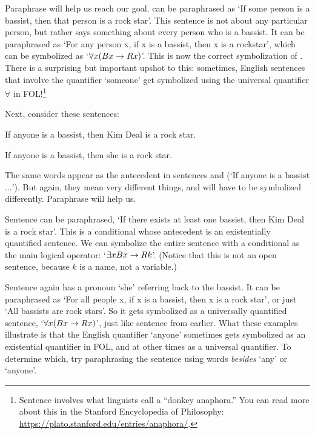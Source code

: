 Paraphrase will help us reach our goal.   can be paraphrased as `If some person is a bassist, then that person is a rock star'. This sentence is not about any particular person, but rather says something about every person who is a bassist.  It can be paraphrased as `For any person x, if x is a bassist, then x is a rockstar', which can be symbolized as `$\forall x (Bx \rightarrow Rx)$'.  This is now the correct symbolization of .  There is a surprising but important upshot to this: sometimes, English sentences that involve the quantifier `someone' get symbolized using the universal quantifier $\forall$ in FOL!\footnote{Sentence  involves what linguists call a ``donkey anaphora.''  You can read more about this in the Stanford Encyclopedia of Philosophy: \href{https://plato.stanford.edu/entries/anaphora/}{https://plato.stanford.edu/entries/anaphora/}.}




Next, consider these sentences:
	\begin{earg}
		\item[\ex{anyone1}] If anyone is a bassist, then Kim Deal is a rock star.
		\item[\ex{anyone2}] If anyone is a bassist, then she is a rock star.
	\end{earg}
The same words appear as the antecedent in sentences  and   (`If anyone is a bassist$\ldots$'). But again, they mean very different things, and will have to be symbolized differently.  Paraphrase will help us.

Sentence  can be paraphrased, `If there exists at least one bassist, then Kim Deal is a rock star'. This is a conditional whose antecedent is an existentially quantified sentence.  We can symbolize the entire sentence with a conditional as the main logical operator: `$\exists x Bx \rightarrow Rk$'.  (Notice that this is not an open sentence, because $k$ is a name, not a variable.)

Sentence  again has a pronoun `she' referring back to the bassist.  It can be paraphrased as `For all people x, if x is a bassist, then x is a rock star', or just `All bassists are rock stars'. So it gets symbolized as a universally quantified sentence, `$\forall x(Bx \rightarrow Rx)$', just like sentence  from earlier.  What these examples illustrate is that the English quantifier `anyone' sometimes gets symbolized as an existential quantifier in FOL, and at other times as a universal quantifier.   To determine which, try paraphrasing the sentence using words \emph{besides} `any' or `anyone'.

